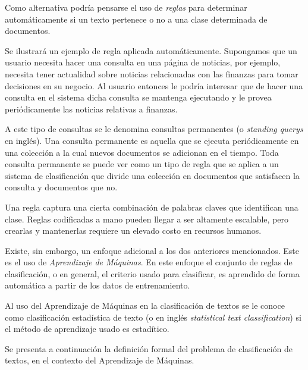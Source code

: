 \documentclass{llncs}
\begin{document}
	Como alternativa podr\'ia pensarse el uso de \emph{reglas} para determinar autom\'aticamente si un texto pertenece o no a una clase determinada de documentos.
	
	Se ilustrar\'a un ejemplo de regla aplicada autom\'aticamente. Supongamos que un usuario necesita hacer una consulta en una p\'agina de noticias, por ejemplo, necesita tener actualidad sobre noticias relacionadas con las finanzas para tomar decisiones en su negocio. Al usuario entonces le podr\'ia interesar que de hacer una consulta en el sistema dicha consulta se mantenga ejecutando y le provea peri\'odicamente las noticias relativas a finanzas. 
	
	A este tipo de consultas se le denomina consultas permanentes  (o \emph{standing querys} en ingl\'es). Una consulta permanente es aquella que se ejecuta peri\'odicamente en una colecci\'on a la cual nuevos  documentos se adicionan en el tiempo. Toda consulta permanente se puede ver como un tipo de regla que se aplica a un sistema de clasificaci\'on que divide una colecci\'on en documentos que satisfacen la consulta y documentos que no.
	
	
	
	Una regla captura una cierta combinaci\'on de palabras claves que identifican una clase. Reglas codificadas a mano pueden llegar a ser altamente escalable, pero crearlas y mantenerlas requiere un elevado costo en recursos humanos.
	
	Existe, sin embargo, un enfoque adicional a los dos anteriores mencionados. Este es el uso de \emph{Aprendizaje de M\'aquinas}. En este enfoque el conjunto de reglas de clasificaci\'on, o en general, el criterio usado para clasificar, es aprendido de forma autom\'atica a partir de los datos de entrenamiento.
	
	Al uso del Aprendizaje de M\'aquinas en la clasificaci\'on de textos se le conoce como clasificaci\'on estad\'istica de texto (o en ingl\'es \emph{statistical text classification}) si el m\'etodo de aprendizaje usado es estad\'itico.
	
	Se presenta a continuaci\'on la definici\'on formal del problema de clasificaci\'on de textos, en el contexto del Aprendizaje de M\'aquinas.
	
\end{document}
